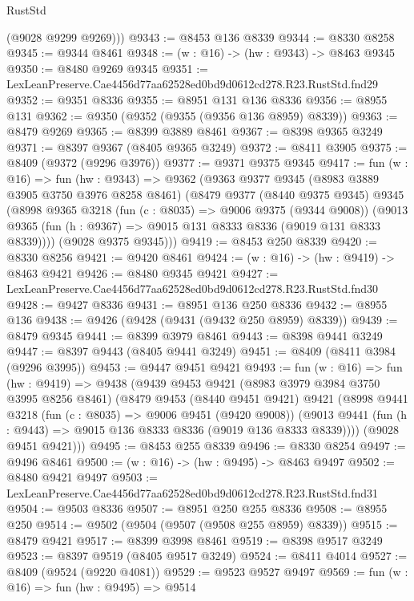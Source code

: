 \begin{lexlean}{RustStd}
\begin{coremodule}
        (@9028 @9299 @9269)))
@9343 := @8453 @136 @8339
@9344 := @8330 @8258
@9345 := @9344 @8461
@9348 := (w : @16) -> (hw : @9343) -> @8463 @9345
@9350 := @8480 @9269 @9345
@9351 := LexLeanPreserve.Cae4456d77aa62528ed0bd9d0612cd278.R23.RustStd.fnd29
@9352 := @9351 @8336
@9355 := @8951 @131 @136 @8336
@9356 := @8955 @131
@9362 := @9350 (@9352 (@9355 (@9356 @136 @8959) @8339))
@9363 := @8479 @9269
@9365 := @8399 @3889 @8461
@9367 := @8398 @9365 @3249
@9371 := @8397 @9367 (@8405 @9365 @3249)
@9372 := @8411 @3905
@9375 := @8409 (@9372 (@9296 @3976))
@9377 := @9371 @9375 @9345
@9417 := fun (w : @16) =>
  fun (hw : @9343) =>
  @9362
    (@9363
      @9377
      @9345
      (@8983 @3889 @3905 @3750 @3976 @8258 @8461)
      (@8479
        @9377
        (@8440 @9375 @9345)
        @9345
        (@8998
          @9365
          @3218
          (fun (c : @8035) => @9006 @9375 (@9344 @9008))
          (@9013 @9365 (fun (h : @9367) => @9015 @131 @8333 @8336 (@9019 @131 @8333 @8339))))
        (@9028 @9375 @9345)))
@9419 := @8453 @250 @8339
@9420 := @8330 @8256
@9421 := @9420 @8461
@9424 := (w : @16) -> (hw : @9419) -> @8463 @9421
@9426 := @8480 @9345 @9421
@9427 := LexLeanPreserve.Cae4456d77aa62528ed0bd9d0612cd278.R23.RustStd.fnd30
@9428 := @9427 @8336
@9431 := @8951 @136 @250 @8336
@9432 := @8955 @136
@9438 := @9426 (@9428 (@9431 (@9432 @250 @8959) @8339))
@9439 := @8479 @9345
@9441 := @8399 @3979 @8461
@9443 := @8398 @9441 @3249
@9447 := @8397 @9443 (@8405 @9441 @3249)
@9451 := @8409 (@8411 @3984 (@9296 @3995))
@9453 := @9447 @9451 @9421
@9493 := fun (w : @16) =>
  fun (hw : @9419) =>
  @9438
    (@9439
      @9453
      @9421
      (@8983 @3979 @3984 @3750 @3995 @8256 @8461)
      (@8479
        @9453
        (@8440 @9451 @9421)
        @9421
        (@8998
          @9441
          @3218
          (fun (c : @8035) => @9006 @9451 (@9420 @9008))
          (@9013 @9441 (fun (h : @9443) => @9015 @136 @8333 @8336 (@9019 @136 @8333 @8339))))
        (@9028 @9451 @9421)))
@9495 := @8453 @255 @8339
@9496 := @8330 @8254
@9497 := @9496 @8461
@9500 := (w : @16) -> (hw : @9495) -> @8463 @9497
@9502 := @8480 @9421 @9497
@9503 := LexLeanPreserve.Cae4456d77aa62528ed0bd9d0612cd278.R23.RustStd.fnd31
@9504 := @9503 @8336
@9507 := @8951 @250 @255 @8336
@9508 := @8955 @250
@9514 := @9502 (@9504 (@9507 (@9508 @255 @8959) @8339))
@9515 := @8479 @9421
@9517 := @8399 @3998 @8461
@9519 := @8398 @9517 @3249
@9523 := @8397 @9519 (@8405 @9517 @3249)
@9524 := @8411 @4014
@9527 := @8409 (@9524 (@9220 @4081))
@9529 := @9523 @9527 @9497
@9569 := fun (w : @16) =>
  fun (hw : @9495) =>
  @9514

\end{coremodule}
\end{lexlean}
